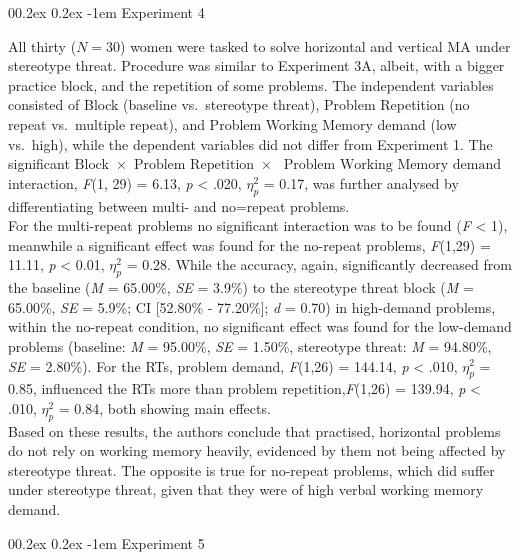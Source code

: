 \documentclass[
  stu]{apa7}
\makeatletter
\let\oldparagraph\paragraph
\renewcommand{\paragraph}[1]{\oldparagraph{#1}\mbox{}}
\renewcommand{\paragraph}{\@startsection{paragraph}{4}{\parindent}%
  {0\baselineskip \@plus 0.2ex \@minus 0.2ex}%
  {-1em}%
  {\normalfont\normalsize\bfseries\itshape\typesectitle}}
\renewcommand{\paragraph}{\@startsection{paragraph}{4}{\parindent}%
  {0\baselineskip \@plus 0.2ex \@minus 0.2ex}%
  {-1em}%
  {\normalfont\normalsize\bfseries\typesectitle}}
\makeatother
\begin{document}
\paragraph{Experiment 4}\label{experiment-4}

All thirty (\(N = 30\)) women were tasked to solve horizontal and vertical MA under stereotype threat.
Procedure was similar to Experiment 3A, albeit, with a bigger practice block, and the repetition of some problems.
The independent variables consisted of Block (baseline vs.~stereotype threat), Problem Repetition (no repeat vs.~multiple repeat), and Problem Working Memory demand (low vs.~high), while the dependent variables did not differ from Experiment 1.
The significant \(\text{Block } \times \text{ Problem Repetition } \times\) \(\text{ Problem Working Memory demand }\) interaction, \emph{F}(1, 29) = 6.13, \emph{p} \textless{} .020, \(\eta^{2}_{p}\) = 0.17, was further analysed by differentiating between multi- and no=repeat problems.\\
For the multi-repeat problems no significant interaction was to be found (\emph{F} \textless{} 1), meanwhile a significant effect was found for the no-repeat problems, \emph{F}(1,29) = 11.11, \emph{p} \textless{} 0.01, \(\eta^{2}_{p}\) = 0.28.
While the accuracy, again, significantly decreased from the baseline (\emph{M} = 65.00\%, \emph{SE} = 3.9\%) to the stereotype threat block (\emph{M} = 65.00\%, \emph{SE} = 5.9\%; CI {[}52.80\% - 77.20\%{]}; \emph{d} = 0.70) in high-demand problems, within the no-repeat condition, no significant effect was found for the low-demand problems (baseline: \emph{M} = 95.00\%, \emph{SE} = 1.50\%, stereotype threat: \emph{M} = 94.80\%, \emph{SE} = 2.80\%).
For the RTs, problem demand, \emph{F}(1,26) = 144.14, \emph{p} \textless{} .010, \(\eta^{2}_{p}\) = 0.85, influenced the RTs more than problem repetition,\emph{F}(1,26) = 139.94, \emph{p} \textless{} .010, \(\eta^{2}_{p}\) = 0.84, both showing main effects.\\
Based on these results, the authors conclude that practised, horizontal problems do not rely on working memory heavily, evidenced by them not being affected by stereotype threat.
The opposite is true for no-repeat problems, which did suffer under stereotype threat, given that they were of high verbal working memory demand.

\paragraph{Experiment 5}\label{experiment-5}
\end{document}
